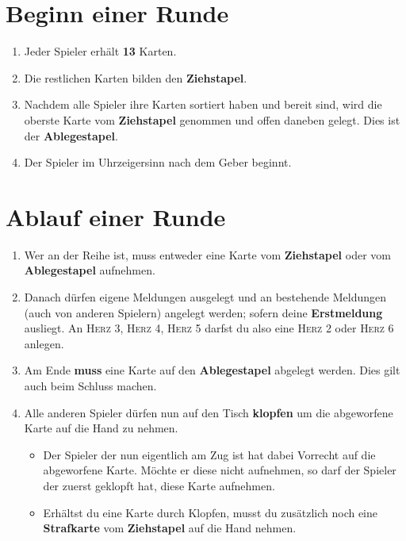 \documentclass[a4paper,12pt,twoside]{article}
\begin{document}
\clearpage

\section{Beginn einer Runde}

\begin{enumerate}
    \item Jeder Spieler erhält \textbf{13} Karten.
    \item Die restlichen Karten bilden den \textbf{Ziehstapel}.
    \item Nachdem alle Spieler ihre Karten sortiert haben und bereit sind, wird die oberste Karte vom \textbf{Ziehstapel} genommen und offen daneben gelegt. Dies ist der \textbf{Ablegestapel}.
    \item Der Spieler im Uhrzeigersinn nach dem Geber beginnt.
\end{enumerate}



\section{Ablauf einer Runde}

\begin{enumerate}
    \item Wer an der Reihe ist, muss entweder eine Karte vom \textbf{Ziehstapel} oder vom \textbf{Ablegestapel} aufnehmen.
    \item Danach dürfen eigene Meldungen ausgelegt und an bestehende Meldungen (auch von anderen Spielern) angelegt werden; sofern deine \textbf{Erstmeldung} ausliegt. An \textsc{Herz 3}, \textsc{Herz 4}, \textsc{Herz 5} darfst du also eine \textsc{Herz 2} oder \textsc{Herz 6} anlegen.
    \item Am Ende \textbf{muss} eine Karte auf den \textbf{Ablegestapel} abgelegt werden. Dies gilt auch beim Schluss machen.
    \item Alle anderen Spieler dürfen nun auf den Tisch \textbf{klopfen} um die abgeworfene Karte auf die Hand zu nehmen.
    \begin{itemize}
        \item Der Spieler der nun eigentlich am Zug ist hat dabei Vorrecht auf die abgeworfene Karte. Möchte er diese nicht aufnehmen, so darf der Spieler der zuerst geklopft hat, diese Karte aufnehmen.
        \item Erhältst du eine Karte durch Klopfen, musst du zusätzlich noch eine \textbf{Strafkarte} vom \textbf{Ziehstapel} auf die Hand nehmen.
    \end{itemize}
\end{enumerate}
\end{document}

